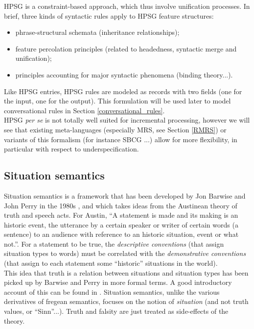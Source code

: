\documentclass[11pt]{article}
\begin{document}
				HPSG is a constraint-based approach, which thus involve unification processes. In brief, three kinds of syntactic rules apply to HPSG feature structures:
				\begin{itemize}
					\item phrase-structural schemata (inheritance relationships);\vspace{-2mm}
					\item feature percolation principles (related to headedness, syntactic merge and unification);\vspace{-2mm}
					\item principles accounting for major syntactic phenomena (binding theory...).
				\end{itemize}
				Like HPSG entries, HPSG rules are modeled as records with two fields (one for the input, one for the output). This formulation will be used later to model conversational rules in Section \ref{conversational_rules}.\\
				
				HPSG \textit{per se} is not totally well suited for incremental processing, however we will see that existing meta-languages (especially MRS, see Section \ref{RMRS}) or variants of this formalism (for instance SBCG \cite{sag2015}...) allow for more flexibility, in particular with respect to underspecification.
			
		\subsection{Situation semantics}
			Situation semantics is a framework that has been developed by Jon Barwise and John Perry in the 1980s \cite{barwise1981, barwise1998}, and which takes ideas from the Austinean theory of truth and speech acts. For Austin, ``A statement is made and its making is an historic event, the utterance by a certain speaker or writer of certain words (a sentence) to an audience with reference to an historic situation, event or what not.''. For a statement to be true, the \textit{descriptive conventions} (that assign situation types to words) must be correlated with the \textit{demonstrative conventions} (that assign to each statement some ``historic'' situations in the world).\\
			
			This idea that truth is a relation between situations and situation types has been picked up by Barwise and Perry in more formal terms. A good introductory account of this can be found in \cite{stojanovic2011}. Situation semantics, unlike the various derivatives of fregean semantics, focuses on the notion of \textit{situation} (and not truth values, or ``Sinn''...). Truth and falsity are just treated as side-effects of the theory.\\
			
\end{document}
